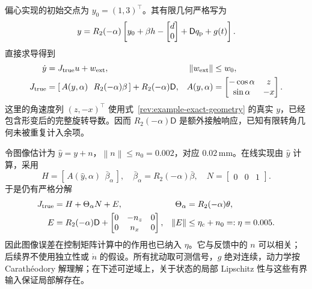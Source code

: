 \documentclass[11pt,a4paper]{article}
\numberwithin{equation}{section}
\theoremstyle{definition}
\newcommand{\norm}[1]{\left\lVert#1\right\rVert}
\begin{document}
偏心实现的初始交点为 $y_0=(1,3)^\top$。其有限几何严格写为
\begin{equation}
 y=R_2(-\alpha)
 \left[y_0+\beta h-\begin{bmatrix}d\\0\end{bmatrix}
       +\mathsf Dq_{\rm p}+g(t)\right].
 \label{rev:example-exact-geometry}
\end{equation}
直接求导得到
\begin{align}
 \dot y&=J_{\rm true}u+w_{\rm ext},
 &\norm{w_{\rm ext}}&\le w_0,\nonumber\\
 J_{\rm true}&=
 \left[\,A(y,\alpha)\ \ R_2(-\alpha)\beta\,\right]
             +R_2(-\alpha)\mathsf D,
 &A(y,\alpha)&=
 \begin{bmatrix}-\cos\alpha&z\\ \sin\alpha&-x\end{bmatrix}.
 \label{rev:example-exact-jacobian}
\end{align}
这里的角速度列 $(z,-x)^\top$ 使用式~\eqref{rev:example-exact-geometry} 的真实 $y$，已经包含形变后的完整旋转导数。因而 $R_2(-\alpha)\mathsf D$ 是额外接触响应，已知有限转角几何未被重复计入余项。

令图像估计为 $\widehat y=y+n$，$\norm{n}\le n_0=0.002$，对应 $0.02\,\mathrm{mm}$。在线实现由 $\widehat y$ 计算，采用
\begin{equation}
 H=\left[\,A(\widehat y,\alpha)\ \ \bar\beta_\alpha\,\right],
 \quad\bar\beta_\alpha=R_2(-\alpha)\bar\beta,
 \quad N=\begin{bmatrix}0&0&1\end{bmatrix}.
 \label{rev:example-known-model}
\end{equation}
于是仍有严格分解
\begin{align}
 J_{\rm true}&=H+\Theta_\alpha N+E,
 &\Theta_\alpha&=R_2(-\alpha)\theta,\nonumber\\
 E&=R_2(-\alpha)\mathsf D+
 \begin{bmatrix}0&-n_z&0\\0&n_x&0\end{bmatrix},
 &\norm{E}&\le\eta_c+n_0=:\eta=0.005.
 \label{rev:example-error-factorization}
\end{align}
因此图像误差在控制矩阵计算中的作用也已纳入 $\eta$。它与反馈中的 $n$ 可以相关；后续界不使用独立性或 $\dot n$ 的假设。所有扰动取可测信号，$g$ 绝对连续，动力学按 Carathéodory 解理解；在下述可逆域上，关于状态的局部 Lipschitz 性与这些有界输入保证局部解存在。
\end{document}
